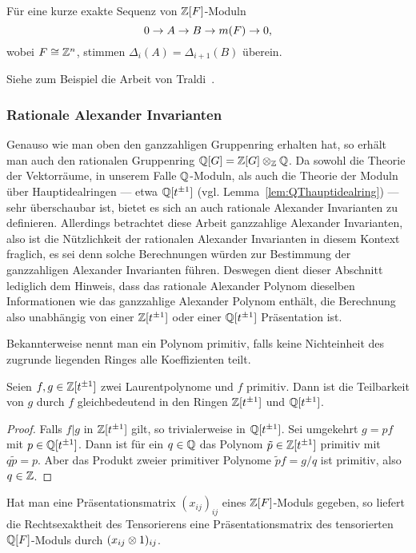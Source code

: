 \begin{lem}
 	Für eine kurze exakte Sequenz von $\mathbb{Z}[F]$-Moduln
 	\[
 	 	0\to A\to B\to m(F)\to0,
 	 \] wobei $F\cong \mathbb{Z}^n$, stimmen $\Delta_i(A)=\Delta_{i+1}(B)$ überein. 
 \end{lem} 
 Siehe zum Beispiel die Arbeit von Traldi~\cite{Traldi.1982}.

	 \subsubsection{Rationale Alexander Invarianten}
	 \label{ssec:rationalalex}

	 Genauso wie man oben den ganzzahligen Gruppenring erhalten hat, so erhält man auch den rationalen Gruppenring $\mathbb{Q}[G]=\mathbb{Z}[G] \otimes_{\mathbb{Z}} \mathbb{Q}$. Da sowohl die Theorie der Vektorräume, in unserem Falle $\mathbb{Q}$-Moduln, als auch die Theorie der Moduln über Hauptidealringen --- etwa $\mathbb{Q}[t^{\pm 1}]$ (vgl. Lemma~\ref{lem:QThauptidealring}) ---  sehr überschaubar ist, bietet es sich an auch rationale Alexander Invarianten zu definieren. Allerdings betrachtet diese Arbeit ganzzahlige Alexander Invarianten, also ist die Nützlichkeit der rationalen Alexander Invarianten in diesem Kontext fraglich, es sei denn solche Berechnungen würden zur Bestimmung der ganzzahligen Alexander Invarianten führen. Deswegen dient dieser Abschnitt lediglich dem Hinweis, dass das rationale Alexander Polynom dieselben Informationen wie das ganzzahlige Alexander Polynom enthält, die Berechnung also unabhängig von einer $\mathbb{Z}[t^{\pm 1}]$ oder einer $\mathbb{Q}[t^{\pm 1}]$ Präsentation ist.

	 Bekannterweise nennt man ein Polynom primitiv, falls keine Nichteinheit des zugrunde liegenden Ringes alle Koeffizienten teilt. 
	 \begin{lem}
	 \label{lem:primitiv}
	 	Seien $f,g \in \mathbb{Z}[t^{\pm 1}]$ zwei Laurentpolynome und $f$ primitiv. Dann ist die Teilbarkeit von $g$ durch $f$ gleichbedeutend in den Ringen $\mathbb{Z}[t^{\pm 1}]$ und $\mathbb{Q}[t^{\pm 1}]$.
	 \end{lem}
	 \begin{proof}
	 	Falls $f|g$ in $\mathbb{Z}[t^{\pm 1}] $ gilt, so trivialerweise in $\mathbb{Q}[t^{\pm 1}]$. Sei umgekehrt $g=pf$ mit $p \in \mathbb{Q}[t^{\pm 1}]$. Dann ist für ein $q \in \mathbb{Q}$ das Polynom $\tilde p \in \mathbb{Z}[t^{\pm 1}]$ primitiv mit $q\tilde p = p$. Aber das Produkt zweier primitiver Polynome $\tilde p f = g/q$ ist primitiv, also $q \in \mathbb{Z}$.
	 \end{proof}

	 \begin{bem}
	 	Hat man eine Präsentationsmatrix $(x_{ij})_{ij}$ eines $\mathbb{Z}[F]$-Moduls gegeben, so liefert die Rechtsexaktheit des Tensorierens eine Präsentationsmatrix des tensorierten $\mathbb{Q}[F]$-Moduls durch $(x_{ij} \otimes 1)_{ij}$.
	 \end{bem}

